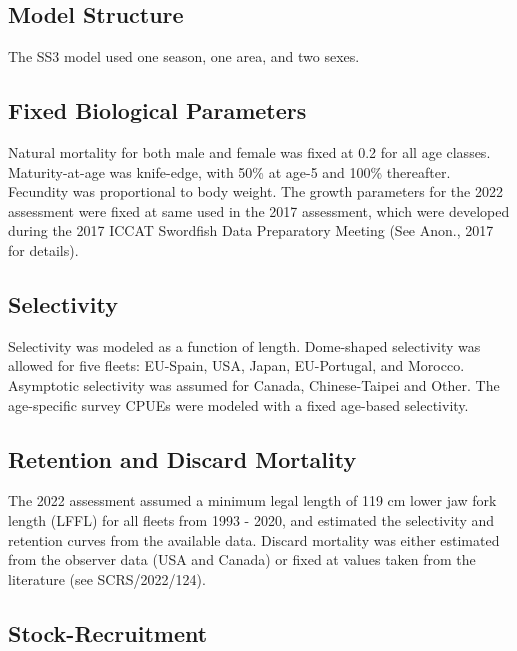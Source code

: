 \documentclass[
]{article}
\begin{document}
\hypertarget{model-structure}{%
\subsection{Model Structure}\label{model-structure}}

The SS3 model used one season, one area, and two sexes.

\hypertarget{fixed-biological-parameters}{%
\subsection{Fixed Biological Parameters}\label{fixed-biological-parameters}}

Natural mortality for both male and female was fixed at 0.2 for all age classes. Maturity-at-age was knife-edge, with 50\% at age-5 and 100\% thereafter. Fecundity was proportional to body weight. The growth parameters for the 2022 assessment were fixed at same used in the 2017 assessment, which were developed during the 2017 ICCAT Swordfish Data Preparatory Meeting (See Anon., 2017 for details).

\hypertarget{selectivity}{%
\subsection{Selectivity}\label{selectivity}}

Selectivity was modeled as a function of length. Dome-shaped selectivity was allowed for five fleets: EU-Spain, USA, Japan, EU-Portugal, and Morocco. Asymptotic selectivity was assumed for Canada, Chinese-Taipei and Other. The age-specific survey CPUEs were modeled with a fixed age-based selectivity.

\hypertarget{retention}{%
\subsection{Retention and Discard Mortality}\label{retention}}

The 2022 assessment assumed a minimum legal length of 119 cm lower jaw fork length (LFFL) for all fleets from 1993 - 2020, and estimated the selectivity and retention curves from the available data. Discard mortality was either estimated from the observer data (USA and Canada) or fixed at values taken from the literature (see SCRS/2022/124).

\hypertarget{stock-recruitment}{%
\subsection{Stock-Recruitment}\label{stock-recruitment}}
\end{document}
